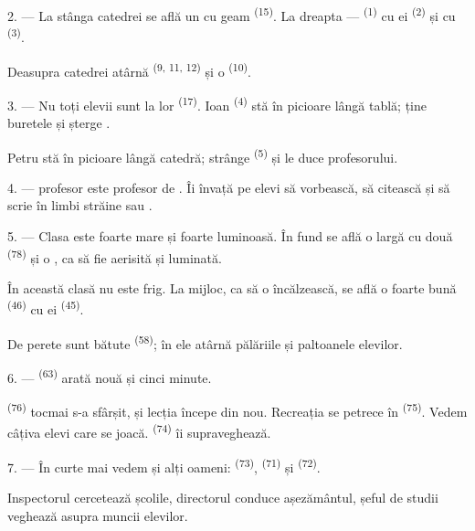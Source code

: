2. --- La stânga catedrei se află un  cu geam
\textsuperscript{(15)}. La dreapta ---  \textsuperscript{(1)} cu
 ei \textsuperscript{(2)} și cu 
\textsuperscript{(3)}.

Deasupra catedrei atârnă  \textsuperscript{(9, 11, 12)} și o
 \textsuperscript{(10)}.

3. --- Nu toți elevii sunt la  lor \textsuperscript{(17)}. Ioan
\textsuperscript{(4)} stă în picioare lângă tablă; ține buretele și șterge
.

Petru stă în picioare lângă catedră; strânge 
\textsuperscript{(5)} și le duce profesorului.

4. ---  profesor este profesor de . Îi învață
pe elevi să vorbească, să citească și să scrie în limbi străine
 sau .

5. --- Clasa este foarte mare și foarte luminoasă. În fund se află o
 largă cu două 
\textsuperscript{(78)} și o , ca să fie aerisită și
luminată.

În această clasă nu este frig. La mijloc, ca să o încălzească, se află o
 foarte bună \textsuperscript{(46)} cu  ei
\textsuperscript{(45)}.

De perete sunt bătute  \textsuperscript{(58)}; în ele atârnă
pălăriile și paltoanele elevilor.

\VUsaut{5.2mm}
\VUsaut{3.6mm}

6. ---  \textsuperscript{(63)} arată nouă și cinci minute.

 \textsuperscript{(76)} tocmai s-a sfârșit, și lecția începe din
nou. Recreația se petrece în  \textsuperscript{(75)}. Vedem câțiva
elevi care se joacă.  \textsuperscript{(74)} îi supraveghează.

7. --- În curte mai vedem și alți oameni: 
\textsuperscript{(73)},  \textsuperscript{(71)} și
 \textsuperscript{(72)}.

Inspectorul cercetează școlile, directorul conduce așezământul, șeful de studii
veghează asupra muncii elevilor.

